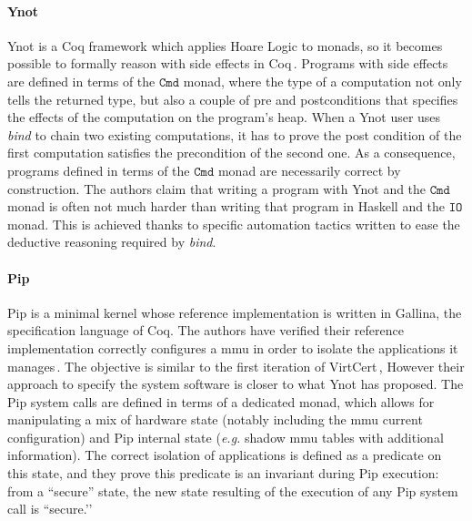 \paragraph{Ynot}
%
Ynot is a Coq framework which applies Hoare Logic to monads, so it becomes
possible to formally reason with side effects in Coq\,\cite{chlipala2009ynot}.
%
Programs with side effects are defined in terms of the $\mathtt{Cmd}$ monad,
where the type of a computation not only tells the returned type, but also a
couple of pre and postconditions that specifies the effects of the computation
on the program's heap.
%
When a Ynot user uses \emph{bind} to chain two existing computations, it has to
prove the post condition of the first computation satisfies the precondition
of the second one.
%
As a consequence, programs defined in terms of the $\mathtt{Cmd}$ monad are
necessarily correct by construction.
%
The authors claim that writing a program with Ynot and the $\mathtt{Cmd}$ monad is
often not much harder than writing that program in Haskell and the $\mathtt{IO}$
monad.
%
This is achieved thanks to specific automation tactics written to ease the
deductive reasoning required by \emph{bind}.

\paragraph{Pip}
%
Pip is a minimal kernel whose reference implementation is written in {\sc
  Gallina}, the specification language of Coq.
%
The authors have verified their reference implementation correctly configures a
\ac{mmu} in order to isolate the applications it manages\,\cite{jomaa2016mmu}.
%
The objective is similar to the first iteration of
VirtCert\,\cite{barthe2011virtcert1}, However their approach to specify the
system software is closer to what Ynot has proposed.
%
The Pip system calls are defined in terms of a dedicated monad, which allows for
manipulating a mix of hardware state (notably including the \ac{mmu} current
configuration) and Pip internal state (\emph{e.g.} shadow \ac{mmu} tables with
additional information).
%
The correct isolation of applications is defined as a predicate on this state,
and they prove this predicate is an invariant during Pip execution:
%
from a ``secure'' state, the new state resulting of the execution of any Pip
system call is ``secure.’’

